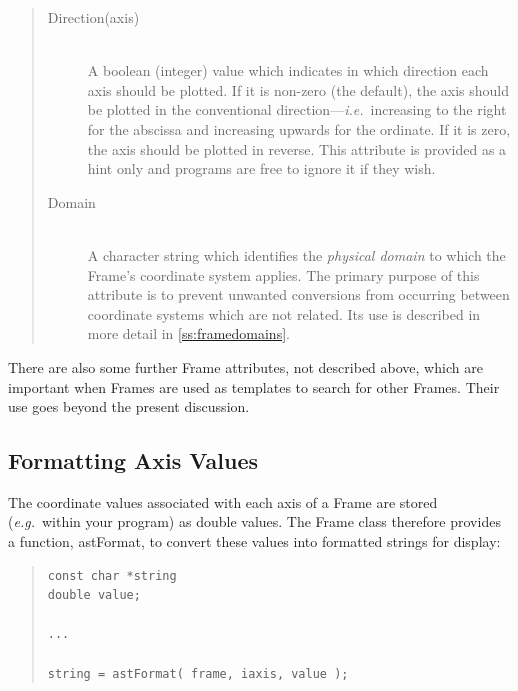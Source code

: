 \documentclass[twoside,11pt]{article}
\newenvironment{latexonly}{}{}
\newcommand{\htmlref}[2]{#1}
\newcommand{\secref}[1]{\S\ref{#1}}
\renewcommand{\secref}[1]{\ref{#1}}
\begin{document}
\begin{quote}
\begin{description}
\item[\htmlref{Direction(axis)}{Directionaxis}]\begin{latexonly}\mbox{}\\ \end{latexonly}
A boolean (integer) value which indicates in which direction each axis
should be plotted. If it is non-zero (the default), the axis should be
plotted in the conventional direction---{\em{i.e.}}\ increasing to the
right for the abscissa and increasing upwards for the ordinate. If it
is zero, the axis should be plotted in reverse.  This attribute is
provided as a hint only and programs are free to ignore it if they
wish.

\item[\htmlref{Domain}{Domain}]\begin{latexonly}\mbox{}\\ \end{latexonly}
A character string which identifies the {\em{physical domain}} to
which the Frame's coordinate system applies. The primary purpose of
this attribute is to prevent unwanted conversions from occurring
between coordinate systems which are not related. Its use is described
in more detail in \secref{ss:framedomains}.
\end{description}
\end{quote}

There are also some further Frame attributes, not described above,
which are important when Frames are used as templates to search for
other Frames. Their use goes beyond the present discussion.

\subsection{\label{ss:formattingaxisvalues}Formatting Axis Values}

The coordinate values associated with each axis of a \htmlref{Frame}{Frame} are stored
({\em{e.g.}}\ within your program) as double values. The Frame class
therefore provides a function, \htmlref{astFormat}{astFormat}, to convert these values into
formatted strings for display:

\begin{quote}
\small
\begin{verbatim}
const char *string
double value;

...

string = astFormat( frame, iaxis, value );
\end{verbatim}
\normalsize
\end{quote}
\end{document}
